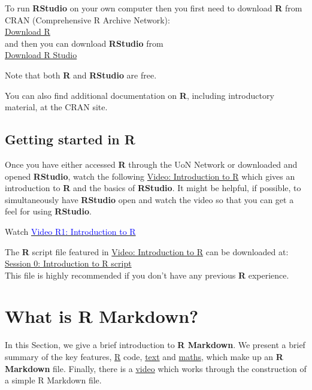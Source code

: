 \documentclass[
]{book}
\begin{document}
To run \textbf{RStudio} on your own computer then you first need to download \textbf{R} from CRAN (Comprehensive R Archive Network):\\
\href{https://cran.rstudio.com}{Download R}\\
and then you can download \textbf{RStudio} from\\
\href{https://www.rstudio.com/products/RStudio/}{Download R Studio}

Note that both \textbf{R} and \textbf{RStudio} are free.

You can also find additional documentation on \textbf{R}, including introductory material, at the CRAN site.

\hypertarget{introR_start}{%
\section{Getting started in R}\label{introR_start}}

Once you have either accessed \textbf{R} through the UoN Network or downloaded and opened \textbf{RStudio}, watch the following \protect\hyperlink{videoR1}{Video: Introduction to R} which gives an introduction to \textbf{R} and the basics of \textbf{RStudio}. It might be helpful, if possible, to simultaneously have \textbf{RStudio} open and watch the video so that you can get a feel for using \textbf{RStudio}.

Watch \href{https://mediaspace.nottingham.ac.uk/media/Introduction+to+RStudio+FINAL+VERSION/1_rz83a6k4}{\textcolor{blue}{Video R1: Introduction to R}}

The \textbf{R} script file featured in \protect\hyperlink{videoR1}{Video: Introduction to R} can be downloaded at:\\
\href{https://moodle.nottingham.ac.uk/course/view.php?id=134982\#section-2}{Session 0: Introduction to R script}\\
This file is highly recommended if you don't have any previous \textbf{R} experience.

\hypertarget{Rmark}{%
\chapter{What is R Markdown?}\label{Rmark}}

In this Section, we give a brief introduction to \textbf{R Markdown}. We present a brief summary of the key features, \protect\hyperlink{Rmark_R}{R} code, \protect\hyperlink{Rmark_text}{text} and \protect\hyperlink{Rmark_maths}{maths}, which make up an \textbf{R Markdown} file. Finally, there is a \protect\hyperlink{videoR2}{video} which works through the construction of a simple R Markdown file.
\end{document}
